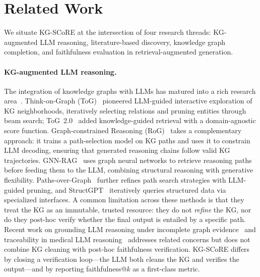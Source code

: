 \section{Related Work}
\label{sec:related}

We situate KG-SCoRE at the intersection of four research threads: KG-augmented LLM reasoning, literature-based discovery, knowledge graph completion, and faithfulness evaluation in retrieval-augmented generation.

\paragraph{KG-augmented LLM reasoning.}
The integration of knowledge graphs with LLMs has matured into a rich research area~\cite{pan2023unifying,han2024graphrag}. Think-on-Graph (ToG)~\cite{sun2023thinkongraph} pioneered LLM-guided interactive exploration of KG neighborhoods, iteratively selecting relations and pruning entities through beam search; ToG~2.0~\cite{ma2024thinkongraph} added knowledge-guided retrieval with a domain-agnostic score function. Graph-constrained Reasoning (RoG)~\cite{luo2024graphconstrained} takes a complementary approach: it trains a path-selection model on KG paths and uses it to constrain LLM decoding, ensuring that generated reasoning chains follow valid KG trajectories. GNN-RAG~\cite{mavromatis2025gnnrag} uses graph neural networks to retrieve reasoning paths before feeding them to the LLM, combining structural reasoning with generative flexibility. Paths-over-Graph~\cite{tan2025pathsovergraph} further refines path search strategies with LLM-guided pruning, and StructGPT~\cite{jiang2023structgpt} iteratively queries structured data via specialized interfaces. A common limitation across these methods is that they treat the KG as an immutable, trusted resource: they do not \emph{refine} the KG, nor do they post-hoc verify whether the final output is entailed by a specific path. Recent work on grounding LLM reasoning under incomplete graph evidence~\cite{li2026grounding} and traceability in medical LLM reasoning~\cite{zhu2026hybrid} addresses related concerns but does not combine KG cleaning with post-hoc faithfulness verification. KG-SCoRE differs by closing a verification loop---the LLM both cleans the KG and verifies the output---and by reporting faithfulness@$k$ as a first-class metric.


